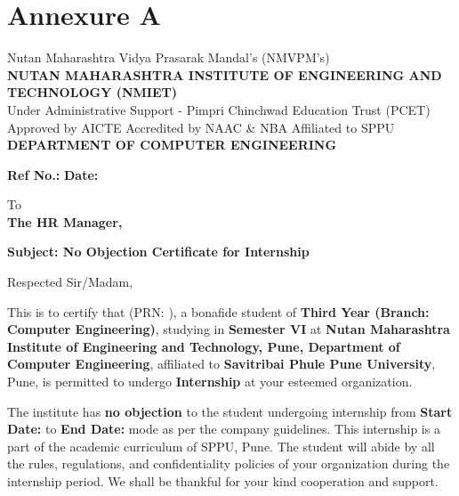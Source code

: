 \documentclass[12pt, a4paper, oneside]{report}
\begin{document}
\chapter*{\vspace{-1cm}Annexure A}
\thispagestyle{fancy}

\vspace{0.5cm}

\begin{center}
    {\small Nutan Maharashtra Vidya Prasarak Mandal's (NMVPM's)}\\[0.1cm]
    {\normalsize \textbf{NUTAN MAHARASHTRA INSTITUTE OF ENGINEERING AND TECHNOLOGY (NMIET)}}\\
    {\small Under Administrative Support - Pimpri Chinchwad Education Trust (PCET)}\\[0.1cm]
    {\small Approved by AICTE \quad Accredited by NAAC \& NBA \quad Affiliated to SPPU}\\[0.1cm]
    {\normalsize \textbf{DEPARTMENT OF COMPUTER ENGINEERING}}\\
\end{center}

\vspace{0.2cm}
\noindent \textbf{Ref No.:} \hfill \textbf{Date:}

\vspace{0.2cm}
\noindent To\\
\textbf{The HR Manager,}

\vspace{0.2cm}
\noindent \textbf{Subject: No Objection Certificate for Internship}

\vspace{0.15cm}
\noindent Respected Sir/Madam,

\vspace{0.15cm}
\noindent This is to certify that \underline{\hspace{3cm}} (PRN: \underline{\hspace{2cm}}), a bonafide student of \textbf{Third Year (Branch: Computer Engineering)}, studying in \textbf{Semester VI} at \textbf{Nutan Maharashtra Institute of Engineering and Technology, Pune, Department of Computer Engineering}, affiliated to \textbf{Savitribai Phule Pune University}, Pune, is permitted to undergo \textbf{Internship} at your esteemed organization.

\vspace{0.15cm}
\noindent The institute has \textbf{no objection} to the student undergoing internship from \textbf{Start Date:} \underline{\hspace{2.5cm}} to \textbf{End Date:} \underline{\hspace{2cm}} mode as per the company guidelines. This internship is a part of the academic curriculum of SPPU, Pune. The student will abide by all the rules, regulations, and confidentiality policies of your organization during the internship period. We shall be thankful for your kind cooperation and support.
\end{document}
